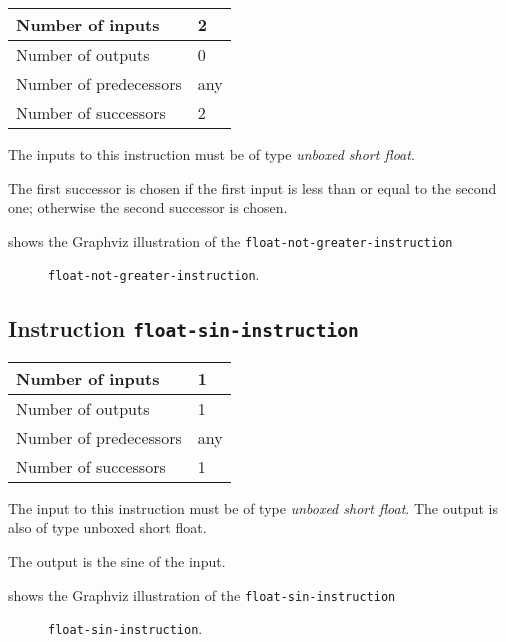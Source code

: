 \begin{tabular}{|l|l|}
\hline
Number of inputs & 2\\
\hline
Number of outputs & 0\\
\hline
Number of predecessors & any\\
\hline
Number of successors & 2\\
\hline
\end{tabular}

The inputs to this instruction must be of type \emph{unboxed short
  float}.

The first successor is chosen if the first input is less than or equal
to the second one; otherwise the second successor is chosen.

 shows the Graphviz illustration of the
\texttt{float-not-greater-instruction}

\begin{figure}
\begin{center}
\end{center}
\caption{\label{fig-float-not-greater-instruction}
\texttt{float-not-greater-instruction}.}
\end{figure}

\subsection{Instruction \texttt{float-sin-instruction}}
\label{mir-instruction-float-div}

\begin{tabular}{|l|l|}
\hline
Number of inputs & 1\\
\hline
Number of outputs & 1\\
\hline
Number of predecessors & any\\
\hline
Number of successors & 1\\
\hline
\end{tabular}

The input to this instruction must be of type \emph{unboxed short
  float}. The output is also of type unboxed short float.

The output is the sine of the input.

 shows the Graphviz illustration of the
\texttt{float-sin-instruction}

\begin{figure}
\begin{center}
\end{center}
\caption{\label{fig-float-sin-instruction}
\texttt{float-sin-instruction}.}
\end{figure}

